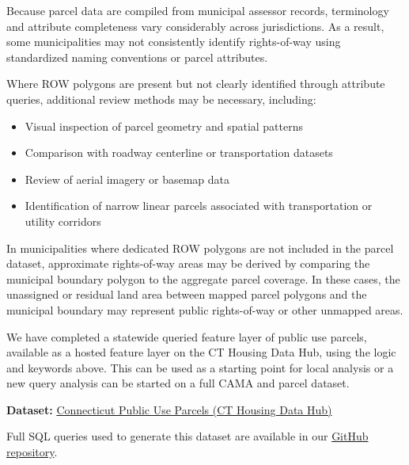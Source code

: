 \documentclass[
  letterpaper,
  DIV=11,
  numbers=noendperiod]{scrreprt}
\providecommand{\tightlist}{%
  \setlength{\itemsep}{0pt}\setlength{\parskip}{0pt}}
\begin{document}
Because parcel data are compiled from municipal assessor records,
terminology and attribute completeness vary considerably across
jurisdictions. As a result, some municipalities may not consistently
identify rights-of-way using standardized naming conventions or parcel
attributes.

Where ROW polygons are present but not clearly identified through
attribute queries, additional review methods may be necessary,
including:

\begin{itemize}
\tightlist
\item
  Visual inspection of parcel geometry and spatial patterns
\item
  Comparison with roadway centerline or transportation datasets
\item
  Review of aerial imagery or basemap data
\item
  Identification of narrow linear parcels associated with transportation
  or utility corridors
\end{itemize}

In municipalities where dedicated ROW polygons are not included in the
parcel dataset, approximate rights-of-way areas may be derived by
comparing the municipal boundary polygon to the aggregate parcel
coverage. In these cases, the unassigned or residual land area between
mapped parcel polygons and the municipal boundary may represent public
rights-of-way or other unmapped areas.

\begin{tcolorbox}[enhanced jigsaw, arc=.35mm, bottomrule=.15mm, breakable, colback=white, colframe=quarto-callout-note-color-frame, left=2mm, leftrule=.75mm, opacityback=0, rightrule=.15mm, toprule=.15mm]

We have completed a statewide queried feature layer of public use
parcels, available as a hosted feature layer on the CT Housing Data Hub,
using the logic and keywords above. This can be used as a starting point
for local analysis or a new query analysis can be started on a full CAMA
and parcel dataset.

\textbf{Dataset:}
\href{https://housingmaps.ct.gov/datasets/ctmaps::connecticut-public-use-parcels-/about}{Connecticut
Public Use Parcels (CT Housing Data Hub)}

Full SQL queries used to generate this dataset are available in our
\href{https://github.com/ctgisoffice/housing/blob/main/SQL_Public_Use_Parcels.sql}{GitHub
repository}.

\end{tcolorbox}
\end{document}

